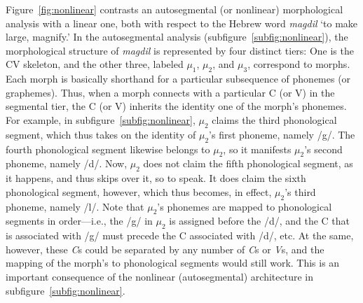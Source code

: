  Figure~\ref{fig:nonlinear} contrasts an autosegmental (or nonlinear) morphological analysis  with a linear one, both with respect to the Hebrew word \textit{magdil} `to make large, magnify.' 
In the autosegmental analysis (subfigure~\ref{subfig:nonlinear}), the morphological structure of \textit{magdil} is represented by four distinct tiers: One is the CV
skeleton, and the other three, labeled $\mu_1$, $\mu_2$, and $\mu_3$, correspond to morphs. Each morph is basically shorthand for a particular subsequence of phonemes (or graphemes). Thus, when a morph connects with a particular C (or V) in the segmental tier, the C (or V) inherits the identity one of the morph's phonemes. For example,  in subfigure~\ref{subfig:nonlinear}, $\mu_2$ claims the third phonological segment, which thus takes on the identity of  $\mu_2$'s first phoneme, namely /g/. The fourth phonological segment likewise belongs to $\mu_2$, so it manifests $\mu_2$'s second phoneme, namely /d/. Now, $\mu_2$ does not claim the fifth phonological segment, as it happens, and thus skips over it, so to speak. It does claim the sixth phonological segment, however, which thus becomes, in effect, $\mu_2$'s third phoneme, namely /l/. 
Note that $\mu_2$'s phonemes are mapped to phonological segments in order---i.e., the /g/ in $\mu_2$ is assigned before the /d/, and the C that is associated with /g/ must precede the C associated with /d/, etc. At the same, however, these \textit{C}s could be separated by any number of \textit{C}s or \textit{V}s, and the mapping of the morph's to phonological segments would still work. This is an important consequence of the nonlinear (autosegmental) architecture in subfigure~\ref{subfig:nonlinear}. 



